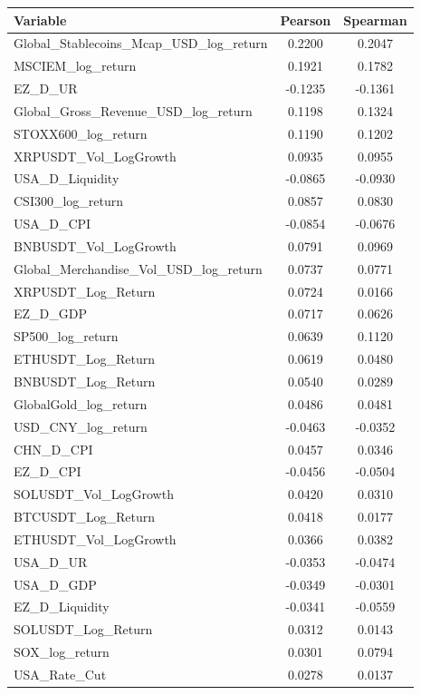 \begin{tabular}{lcc}
  \toprule
  \textbf{Variable} & \textbf{Pearson} & \textbf{Spearman} \\ 
  \midrule
  Global\_Stablecoins\_Mcap\_USD\_log\_return & 0.2200 & 0.2047 \\ 
  MSCIEM\_log\_return & 0.1921 & 0.1782 \\ 
  EZ\_D\_UR & -0.1235 & -0.1361 \\ 
  Global\_Gross\_Revenue\_USD\_log\_return & 0.1198 & 0.1324 \\ 
  STOXX600\_log\_return & 0.1190 & 0.1202 \\ 
  XRPUSDT\_Vol\_LogGrowth & 0.0935 & 0.0955 \\ 
  USA\_D\_Liquidity & -0.0865 & -0.0930 \\ 
  CSI300\_log\_return & 0.0857 & 0.0830 \\ 
  USA\_D\_CPI & -0.0854 & -0.0676 \\ 
  BNBUSDT\_Vol\_LogGrowth & 0.0791 & 0.0969 \\ 
  Global\_Merchandise\_Vol\_USD\_log\_return & 0.0737 & 0.0771 \\ 
  XRPUSDT\_Log\_Return & 0.0724 & 0.0166 \\ 
  EZ\_D\_GDP & 0.0717 & 0.0626 \\ 
  SP500\_log\_return & 0.0639 & 0.1120 \\ 
  ETHUSDT\_Log\_Return & 0.0619 & 0.0480 \\ 
  BNBUSDT\_Log\_Return & 0.0540 & 0.0289 \\ 
  GlobalGold\_log\_return & 0.0486 & 0.0481 \\ 
  USD\_CNY\_log\_return & -0.0463 & -0.0352 \\ 
  CHN\_D\_CPI & 0.0457 & 0.0346 \\ 
  EZ\_D\_CPI & -0.0456 & -0.0504 \\ 
  SOLUSDT\_Vol\_LogGrowth & 0.0420 & 0.0310 \\ 
  BTCUSDT\_Log\_Return & 0.0418 & 0.0177 \\ 
  ETHUSDT\_Vol\_LogGrowth & 0.0366 & 0.0382 \\ 
  USA\_D\_UR & -0.0353 & -0.0474 \\ 
  USA\_D\_GDP & -0.0349 & -0.0301 \\ 
  EZ\_D\_Liquidity & -0.0341 & -0.0559 \\ 
  SOLUSDT\_Log\_Return & 0.0312 & 0.0143 \\ 
  SOX\_log\_return & 0.0301 & 0.0794 \\ 
  USA\_Rate\_Cut & 0.0278 & 0.0137 \\ 

\end{tabular}
